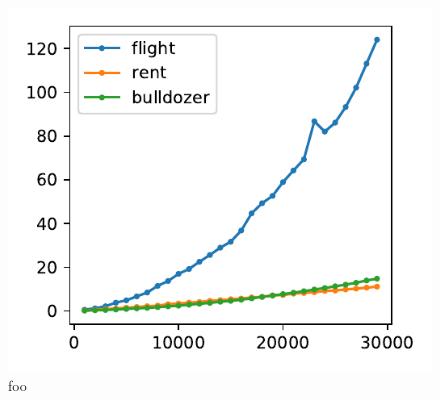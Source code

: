 \documentclass[11pt]{article}
\begin{document}
\begin{figure}[htbp]
\begin{center}
\includegraphics[scale=0.5]{images/timing}
\caption{\small foo}
\label{fig:timing}
\end{center}
\end{figure}
\end{document}
